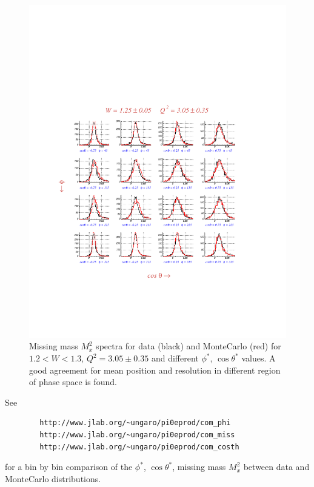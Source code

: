 \begin{figure}[h]
 \begin{center}
 \includegraphics[width = 15.2cm, bb=60 120 520 560]{acceptance/img/comp_mm_datamc} 
  \caption[Missing mass $M_x^2$ spectra for data and MonteCarlo ]
          { Missing mass $M_x^2$ spectra for data (black) and MonteCarlo (red) for 
	             $1.2 < W < 1.3$, $Q^2 = 3.05\pm 0.35$ and different $\phi^*$, $\cos\theta^*$
		     values. A good agreement for mean position and resolution in different region of phase
		     space is found. }
 \label{fig:mm_gsim}
 \end{center}
\end{figure}

See    \begin{verbatim} 
        http://www.jlab.org/~ungaro/pi0eprod/com_phi 
        http://www.jlab.org/~ungaro/pi0eprod/com_miss
        http://www.jlab.org/~ungaro/pi0eprod/com_costh
\end{verbatim}
for a bin by bin comparison of the $\phi^*$, $\cos\theta^*$, missing mass $M_x^2$ between data
and MonteCarlo distributions.


